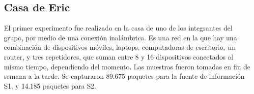 

\subsection{Casa de Eric}
El primer experimento fue realizado en la casa de uno de los integrantes del grupo, por
medio de una conexión inalámbrica. Es una red en la que hay una combinación de dispositivos
móviles, laptops, computadoras de escritorio, un router, y tres repetidores, 
que suman entre 8 y 16 dispositivos conectados al mismo tiempo, dependiendo del momento.
Las muestras fueron tomadas en fin de semana a la tarde. Se capturaron 89.675 paquetes
para la fuente de información S1, y 14.185 paquetes para S2.